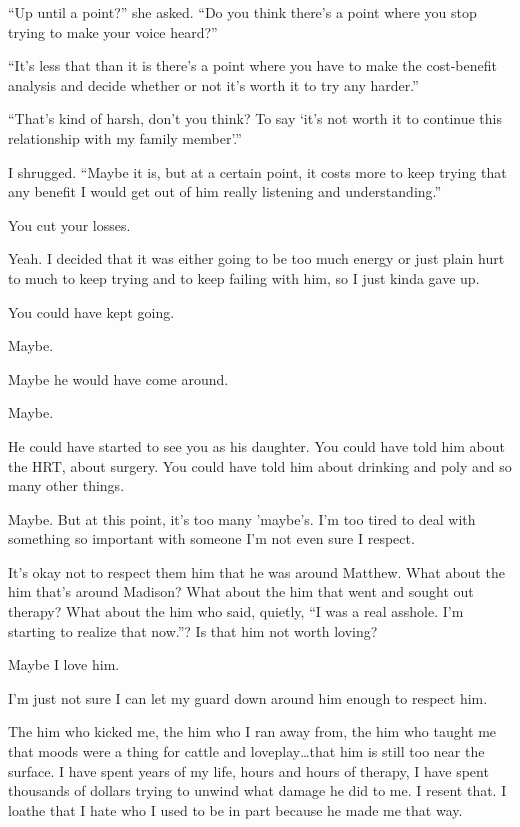 \begin{paracol}{2}
\begin{leftcolumn}
``Up until a point?'' she asked. ``Do you think there's a point where you stop trying to make your voice heard?''

``It's less that than it is there's a point where you have to make the cost-benefit analysis and decide whether or not it's worth it to try any harder.''

``That's kind of harsh, don't you think? To say `it's not worth it to continue this relationship with my family member'.''

I shrugged. ``Maybe it is, but at a certain point, it costs more to keep trying that any benefit I would get out of him really listening and understanding.''

\begin{ally}
You cut your losses.
\end{ally}
Yeah. I decided that it was either going to be too much energy or just plain hurt to much to keep trying and to keep failing with him, so I just kinda gave up.

\begin{ally}
You could have kept going.
\end{ally}
Maybe.

\begin{ally}
Maybe he would have come around.
\end{ally}
Maybe.

\begin{ally}
He could have started to see you as his daughter. You could have told him about the HRT, about surgery. You could have told him about drinking and poly and so many other things.
\end{ally}
Maybe. But at this point, it's too many 'maybe's. I'm too tired to deal with something so important with someone I'm not even sure I respect.

\begin{ally}
It's okay not to respect them him that he was around Matthew. What about the him that's around Madison? What about the him that went and sought out therapy? What about the him who said, quietly, ``I was a real asshole. I'm starting to realize that now.''? Is that him not worth loving?
\end{ally}
Maybe I love him.

I'm just not sure I can let my guard down around him enough to respect him.

The him who kicked me, the him who I ran away from, the him who taught me that moods were a thing for cattle and loveplay\ldots{}that him is still too near the surface. I have spent years of my life, hours and hours of therapy, I have spent thousands of dollars trying to unwind what damage he did to me. I resent that. I loathe that I hate who I used to be in part because he made me that way.


\end{leftcolumn}
\end{paracol}
